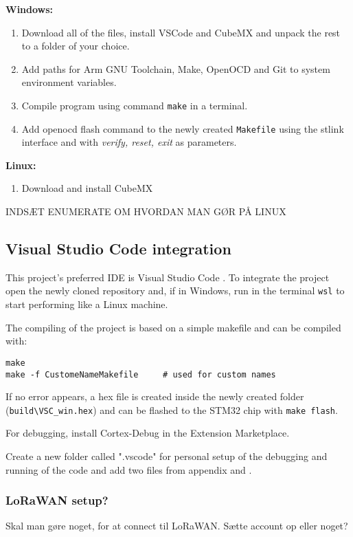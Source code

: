 \textbf{Windows:}
\begin{enumerate}
    \item Download all of the files, install VSCode and CubeMX and unpack the rest to a folder of your choice.
    \item Add paths for Arm GNU Toolchain, Make, OpenOCD and Git to system environment variables.
    \item Compile program using command \lstinline[style=bash]{make} in a terminal.
    \item Add openocd flash command to the newly created \lstinline[style=bash]{Makefile} using the stlink interface and with \textit{verify, reset, exit} as parameters.
 \end{enumerate}

\textbf{Linux:}
\begin{enumerate}
    \item Download and install CubeMX
\end{enumerate}
INDSÆT ENUMERATE OM HVORDAN MAN GØR PÅ LINUX

\subsection{Visual Studio Code integration}
This project's preferred \ac{IDE} is Visual Studio Code . To integrate the project open the newly cloned repository and, if in Windows, run in the terminal \lstinline[style=bash]{wsl} to start performing like a Linux machine.

The compiling of the project is based on a simple makefile and can be compiled with:
\begin{lstlisting}[style=bash]
make
make -f CustomeNameMakefile     # used for custom names
\end{lstlisting}
If no error appears, a hex file is created inside the newly created folder (\lstinline[style=bash]{build\VSC_win.hex}) and can be flashed to the STM32 chip with \lstinline[style=bash]{make flash}.

For debugging, install Cortex-Debug  in the Extension Marketplace.

Create a new folder called ".vscode" for personal setup of the debugging and running of the code and add two files from appendix  and .

\subsubsection*{LoRaWAN setup?}
Skal man gøre noget, for at connect til LoRaWAN. Sætte account op eller noget?


